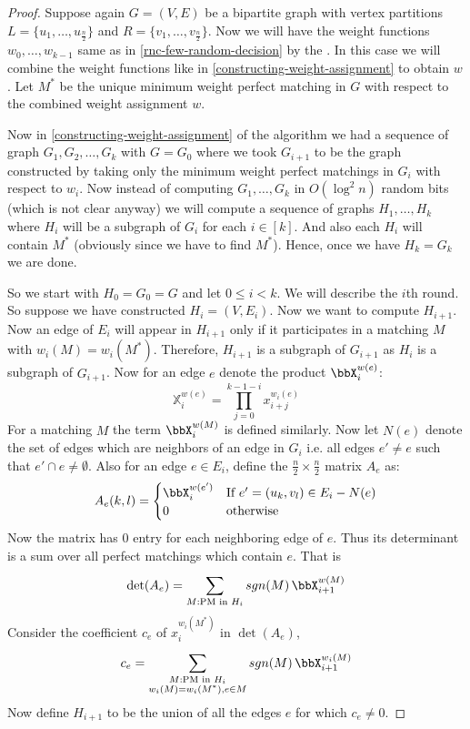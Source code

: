\begin{proof}
	Suppose again $G=(V,E)$ be a bipartite graph with vertex partitions $L=\{u_1,\dots, u_{\frac{n}{2}}\}$ and $R=\{v_1,\dots,v_{\frac{n }{2}}\}$. Now we will have the weight functions $w_0,\dots, w_{k-1}$ same as in \autoref{rnc-few-random-decision} by the . In this case we will combine the weight functions like in \autoref{constructing-weight-assignment} to obtain $w$. Let $M^*$ be the unique minimum weight perfect matching in $G$ with respect to the combined weight assignment $w$.

	Now in \autoref{constructing-weight-assignment} of the  algorithm we had a sequence of graph $G_1,G_2,\dots, G_{k}$ with $G=G_0$ where we took $G_{i+1}$ to be the graph constructed by taking only the minimum weight perfect matchings in $G_{i}$ with respect to $w_{i}$. Now instead of computing $G_1,\dots, G_k$ in $O(\log^2n)$ random bits (which is not clear anyway) we will compute a sequence of graphs $H_1,\dots, H_k$ where $H_{i}$ will be a subgraph of $G_{i}$ for each $i\in[k]$. And also each $H_i$ will contain $M^*$ (obviously since we have to find $M^*$). Hence, once we have $H_k=G_k$ we are done.

	So we start with $H_0=G_0=G$ and let $0\leq i<k$. We will describe the $i$th round. So suppose we have constructed $H_i=(V,E_i)$. Now we want to compute $H_{i+1}$. Now an edge of $E_i$ will appear in $H_{i+1}$ only if it participates in a matching $M$ with $w_i(M)=w_i(M^*)$. Therefore, $H_{i+1}$ is a subgraph of $G_{i+1}$ as $H_i$ is a subgraph of $G_{i+1}$. Now for an edge $e$ denote the product $\bbX_i^{w(e)}$:\[
		\mathbb{X}_i^{w(e)}= \prod_{j=0}^{k-1-i}x_{i+j}^{w_i(e)}
	\]For a matching $M$ the term $\bbX^{w(M)}_i$ is defined similarly. Now let $N(e)$ denote the set of edges which are neighbors of an edge in $G_i$ i.e. all edges $e'\neq e$ such that $e'\cap e\neq \emptyset$. Also for an edge $e\in E_i$, define the $\frac{n}{2}\times \frac{n}{2}$ matrix $A_e$ as:\[
		A_e(k,l)=\begin{cases}
			\bbX^{w(e')}_i & \text{If $e'=(u_k,v_l)\in E_i-N(e)$} \\
			0              & \text{otherwise}
		\end{cases}
	\]
	Now the matrix has $0$ entry for each neighboring edge of $e$. Thus its determinant is a sum over all perfect matchings which contain $e$. That is\[
		\det(A_e)= \sum\limits_{M:\text{PM in $H_i$}}^{} sgn(M)\,\bbX_{i+1}^{w(M)}
	\]Consider the coefficient $c_e$ of $x_i^{w_i(M^*)}$ in $\det(A_e)$, \[
		c_e=\sum\limits_{\substack{M:\text{PM in $H_i$} \\ w_i(M)=w_i(M^*),e\in M}}^{}sgn(M)\,\bbX_{i+1}^{w_i(M)}
	\]Now define $H_{i+1}$ to be the union of all the edges $e$ for which $c_e\neq 0$.\parinf


\end{proof}
